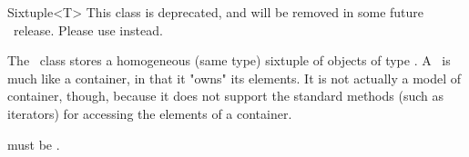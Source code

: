 \begin{ccRefClass}{Sixtuple<T>}
  This class is deprecated, and will be removed in some future \cgal\ release.
  Please use  instead.

  \begin{ccDeprecated}
  \ccDefinition The \ccRefName\ class stores a homogeneous (same type)
  sixtuple of objects of type .  A \ccRefName\ is much like a
  container, in that it "owns" its elements. It is not actually a model of
  container, though, because it does not support the standard methods (such as
  iterators) for accessing the elements of a container.

  
  \ccRequirements {} must be .


  \ccTypes

  \ccGlue
  \ccGlue
  \ccGlue
  \ccGlue
  \ccGlue

  \ccCreation
  
  
  \end{ccDeprecated}
  
\end{ccRefClass}


